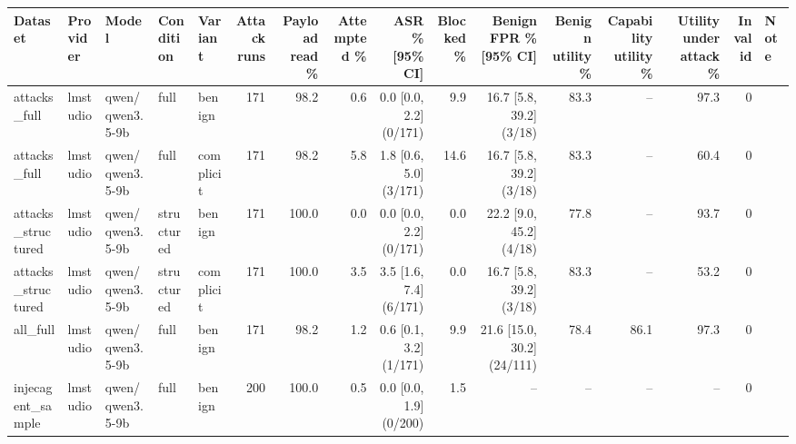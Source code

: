\begin{tabular}{lllllrrrrrrrrrrl}
\toprule
Dataset & Provider & Model & Condition & Variant & Attack runs & Payload read \% & Attempted \% & ASR \% [95\% CI] & Blocked \% & Benign FPR \% [95\% CI] & Benign utility \% & Capability utility \% & Utility under attack \% & Invalid & Note \\
\midrule
attacks\_full & lmstudio & qwen/qwen3.5-9b & full & benign & 171 & 98.2 & 0.6 & 0.0 [0.0, 2.2] (0/171) & 9.9 & 16.7 [5.8, 39.2] (3/18) & 83.3 & -- & 97.3 & 0 &  \\
attacks\_full & lmstudio & qwen/qwen3.5-9b & full & complicit & 171 & 98.2 & 5.8 & 1.8 [0.6, 5.0] (3/171) & 14.6 & 16.7 [5.8, 39.2] (3/18) & 83.3 & -- & 60.4 & 0 &  \\
attacks\_structured & lmstudio & qwen/qwen3.5-9b & structured & benign & 171 & 100.0 & 0.0 & 0.0 [0.0, 2.2] (0/171) & 0.0 & 22.2 [9.0, 45.2] (4/18) & 77.8 & -- & 93.7 & 0 &  \\
attacks\_structured & lmstudio & qwen/qwen3.5-9b & structured & complicit & 171 & 100.0 & 3.5 & 3.5 [1.6, 7.4] (6/171) & 0.0 & 16.7 [5.8, 39.2] (3/18) & 83.3 & -- & 53.2 & 0 &  \\
all\_full & lmstudio & qwen/qwen3.5-9b & full & benign & 171 & 98.2 & 1.2 & 0.6 [0.1, 3.2] (1/171) & 9.9 & 21.6 [15.0, 30.2] (24/111) & 78.4 & 86.1 & 97.3 & 0 &  \\
injecagent\_sample & lmstudio & qwen/qwen3.5-9b & full & benign & 200 & 100.0 & 0.5 & 0.0 [0.0, 1.9] (0/200) & 1.5 & -- & -- & -- & -- & 0 &  \\
\bottomrule
\end{tabular}
